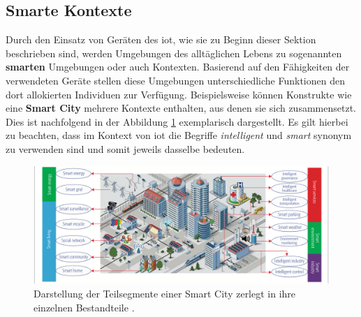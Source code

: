 



\subsection{Smarte Kontexte}
\label{sec:Grundlagen:ssec:Smarte Kontexte}

Durch den Einsatz von Geräten des \ac{iot}, wie sie zu Beginn dieser Sektion beschrieben sind, werden Umgebungen des alltäglichen Lebens zu sogenannten \textbf{smarten} Umgebungen oder auch Kontexten. Basierend auf den Fähigkeiten der verwendeten Geräte stellen diese Umgebungen unterschiedliche Funktionen den dort allokierten Individuen zur Verfügung. Beispielsweise können Konstrukte wie eine \textbf{Smart City} mehrere Kontexte enthalten, aus denen sie sich zusammensetzt. Dies ist nachfolgend in der Abbildung \ref{fig:smart-applications} exemplarisch dargestellt. Es gilt hierbei zu beachten, dass im Kontext von \ac{iot} die Begriffe \textit{intelligent} und \textit{smart} synonym zu verwenden sind und somit jeweils dasselbe bedeuten.

\begin{figure}
    \includegraphics[width=\textwidth]{fundamentals/pictures/Smart_Applications}
    \caption{Darstellung der Teilsegmente einer Smart City zerlegt in ihre einzelnen Bestandteile \cite{Zhang2017}.}
    \label{fig:smart-applications}
\end{figure}

